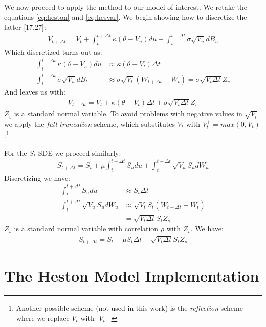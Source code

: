 \documentclass[12pt,oneside]{reedthesis}
\theoremstyle{definition}
\theoremstyle{definition}
\theoremstyle{remark}
\begin{document}
  We now proceed to apply the method to our model of interest. We retake
  the equations \eqref{eq:heston} and \eqref{eq:hesvar}. We begin showing how
  to discretize the latter {[}17,27{]}:
  \begin{align}
  \label{eq:hesvareuler}
  V_{t+\Delta t} = V_t+ \int_{t}^{t+\Delta t}{\kappa (\theta - V_u) du} + \int_{t}^{t+\Delta t}{\sigma \sqrt{V_u} dB_u}
  \end{align}
  Which discretized turns out as:
  \begin{align*}
   \int_{t}^{t+\Delta t}{\kappa (\theta - V_u)} du &\approx \kappa (\theta - V_t) \Delta t\\
   \int_{t}^{t+\Delta t}{\sigma \sqrt{V_u}} dB_t &\approx \sigma \sqrt{V_t} (W_{t+\Delta t}-W_t)
  = \sigma \sqrt{V_t \Delta t} Z_v
  \end{align*}
  And leaves us with:
  \begin{align}
  V_{t+\Delta t} = V_t + \kappa (\theta - V_t) \Delta t + \sigma \sqrt{V_t \Delta t} Z_v
  \end{align}
  \(Z_v\) is a standard normal variable. To avoid problems with negative
  values in \(\sqrt{V_t}\) we apply the \emph{full truncation} scheme,
  which substitutes \(V_t\) with \(V_t^+ = max(0, V_t)\).\footnote{Another
    possible scheme (not used in this work) is the \emph{reflection}
    scheme where we replace \(V_t\) with \(\mid V_t \mid\)}
  
  For the \(S_t\) SDE we proceed similarly:
  \begin{align}
  \label{eq:heseuler}
  S_{t+\Delta t} = S_t+ \mu \int_{t}^{t+\Delta t}{ S_u du} + \int_{t}^{t+\Delta t}{\sqrt{V_u} S_u dW_u}
  \end{align}
  Discretizing we have:
  \begin{align*}
   \int_{t}^{t+\Delta t}{S_u} du &\approx S_t \Delta t\\
   \int_{t}^{t+\Delta t}{\sqrt{V_u} S_u} dW_u &\approx \sqrt{V_t} S_t (W_{t+\Delta t}-W_t)\\
  &= \sqrt{V_t \Delta t} S_t Z_s
  \end{align*}
  \(Z_s\) is a standard normal variable with correlation \(\rho\) with
  \(Z_v\). We have:
  \begin{align}
  S_{t+\Delta t} = S_t + \mu S_t \Delta t + \sqrt{V_t \Delta t} S_t Z_s
  \end{align}
  \chapter{The Heston Model Implementation}\label{implement}
  
\end{document}
